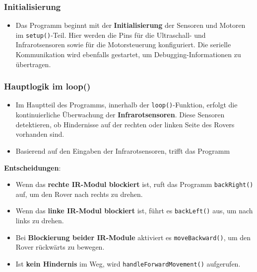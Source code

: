 \documentclass{vorlage-design-main}
\begin{document}
\hypertarget{initialisierung}{%
\subsubsection{Initialisierung}\label{initialisierung}}

\begin{itemize}

\item
  Das Programm beginnt mit der \textbf{Initialisierung} der Sensoren und
  Motoren im \verb|setup()|-Teil. Hier werden die
  Pins für die Ultraschall- und Infrarotsensoren sowie für die
  Motorsteuerung konfiguriert. Die serielle Kommunikation wird ebenfalls
  gestartet, um Debugging-Informationen zu übertragen.
\end{itemize}

\hypertarget{hauptlogik-im-loop}{%
\subsubsection{Hauptlogik im loop()}\label{hauptlogik-im-loop}}

\begin{itemize}

\item
  Im Hauptteil des Programms, innerhalb der
  \verb|loop()|-Funktion, erfolgt die kontinuierliche
  Überwachung der \textbf{Infrarotsensoren}. Diese Sensoren detektieren,
  ob Hindernisse auf der rechten oder linken Seite des Rovers vorhanden
  sind.
\item
  Basierend auf den Eingaben der Infrarotsensoren, trifft das Programm
\end{itemize}

\textbf{Entscheidungen}:

\begin{itemize}

\item
  Wenn das \textbf{rechte IR-Modul blockiert} ist, ruft das Programm
  \verb|backRight()| auf, um den Rover nach rechts zu
  drehen.
\item
  Wenn das \textbf{linke IR-Modul blockiert} ist, führt es
  \verb|backLeft()| aus, um nach links zu drehen.
\item
  Bei \textbf{Blockierung beider IR-Module} aktiviert es
  \verb|moveBackward()|, um den Rover rückwärts zu
  bewegen.
\item
  Ist \textbf{kein Hindernis} im Weg, wird
  \verb|handleForwardMovement()| aufgerufen.
\end{itemize}
\end{document}
